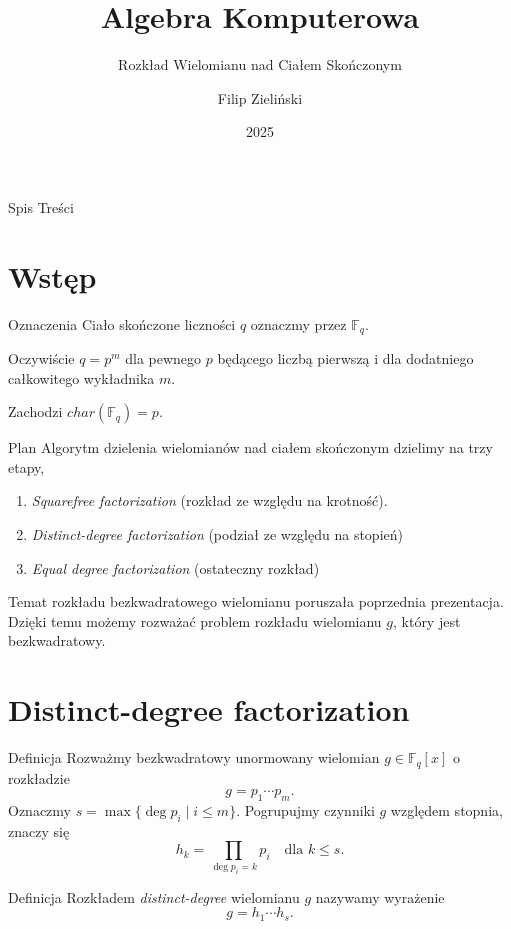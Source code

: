 \documentclass{beamer}
\title{Algebra Komputerowa}
\subtitle{Rozkład Wielomianu nad Ciałem Skończonym \cite{ComputerAlgebra,LCM}}
\author{Filip Zieli\'nski}
\date{2025}
\begin{document}
\begin{frame}
    \titlepage
\end{frame}
 
\begin{frame}{Spis Treści}
    \tableofcontents
\end{frame}

\section{Wstęp}
\begin{frame}{Oznaczenia}
    Ciało skończone liczności $q$ oznaczmy przez $\mathbb{F}_q$. 
    
    Oczywiście $q = p^m$ dla pewnego $p$ będącego liczbą pierwszą i dla dodatniego całkowitego wykładnika $m$. 

     Zachodzi $char(\mathbb{F}_q)= p$.
\end{frame}

\begin{frame}{Plan}
    Algorytm dzielenia wielomianów nad ciałem skończonym dzielimy na trzy etapy,
    \begin{enumerate}
        \item \textit{Squarefree factorization} (rozkład ze względu na krotność).
        \item \textit{Distinct-degree factorization} (podział ze względu na stopień)
        \item \textit{Equal degree factorization} (ostateczny rozkład)
    \end{enumerate}
    \pause 
    Temat rozkładu bezkwadratowego wielomianu poruszała poprzednia prezentacja.
    Dzięki temu możemy rozważać problem rozkładu wielomianu $g$, który jest bezkwadratowy.
\end{frame}

\section{Distinct-degree factorization}
\begin{frame}{Definicja}
    Rozważmy bezkwadratowy unormowany wielomian $g \in \mathbb{F}_q[x]$ o rozkładzie
    $$g = p_1 \cdots p_m.$$
    Oznaczmy $s = \max \{ \deg p_i \mid i \leq m\}.$
    Pogrupujmy czynniki $g$ względem stopnia, znaczy się 
    $$h_k = \prod_{\deg p_i = k}p_i \quad \text{dla } k \leq s.$$
    \begin{block}{Definicja}
        Rozkładem \textit{distinct-degree} wielomianu $g$ nazywamy wyrażenie 
        $$ g = h_1 \cdots h_s.$$
    \end{block}
\end{frame}
\end{document}
